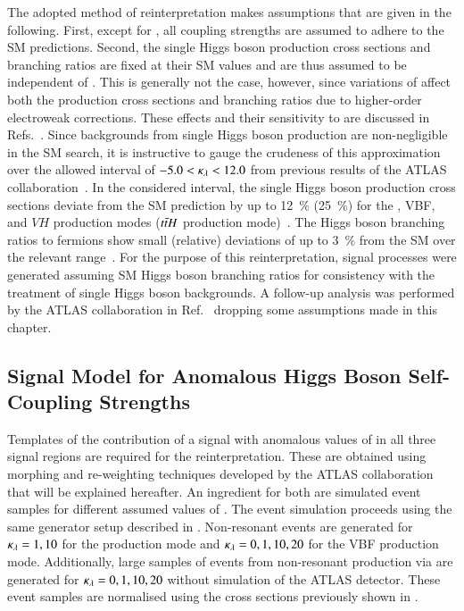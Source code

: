 The adopted method of reinterpretation makes assumptions that are
given in the following. First, except for \klambda, all coupling
strengths are assumed to adhere to the SM predictions. Second, the
single Higgs boson production cross sections and branching ratios are
fixed at their SM values and are thus assumed to be independent of
\klambda. This is generally not the case, however, since variations of
\klambda affect both the production cross sections and branching
ratios due to higher-order electroweak corrections. These effects and
their sensitivity to \klambda are discussed in
Refs.~\cite{ATL-PHYS-PUB-2019-009,Degrassi:2016wml,Maltoni:2017ims}.
Since backgrounds from single Higgs boson production are
non-negligible in the SM \HH search, it is instructive to gauge the
crudeness of this approximation over the allowed interval of
$-5.0 < \kappa_{\lambda} < 12.0$ from previous results of the ATLAS
collaboration~\cite{HDBS-2018-58}. In the considered \klambda
interval, the single Higgs boson production cross sections deviate
from the SM prediction by up to \SI{12}{\percent} (\SI{25}{\percent})
for the \ggF, VBF, and $VH$ production modes ($t\bar{t} H$ production
mode)~\cite{ATL-PHYS-PUB-2019-009}. The Higgs boson branching ratios
to fermions show small (relative) deviations of up to \SI{3}{\percent}
from the SM over the relevant \klambda
range~\cite{ATL-PHYS-PUB-2019-009}. For the purpose of this
reinterpretation, signal processes were generated assuming SM Higgs
boson branching ratios for consistency with the treatment of single
Higgs boson backgrounds. A follow-up analysis was performed by the
ATLAS collaboration in Ref.~\cite{ATL-HDBS-2022-03-002} dropping some
assumptions made in this chapter.


\subsection{Signal Model for Anomalous Higgs Boson Self-Coupling Strengths}%
\label{sec:self_coupling_signals}

Templates of the contribution of a signal with anomalous values of
\klambda in all three signal regions are required for the
reinterpretation. These are obtained using morphing and re-weighting
techniques developed by the ATLAS collaboration that will be explained
hereafter. An ingredient for both are simulated event samples for
different assumed values of \klambda. The event simulation proceeds
using the same generator setup described in
. Non-resonant \HH events are generated
for $\kappa_{\lambda} = 1, 10$ for the \ggF production mode and
$\kappa_{\lambda} = 0, 1, 10, 20$ for the VBF production mode. Additionally,
large samples of events from non-resonant \HH production via \ggF are
generated for $\kappa_{\lambda} = 0, 1, 10, 20$ without simulation of the
ATLAS detector. These event samples are normalised using the cross
sections previously shown in .

